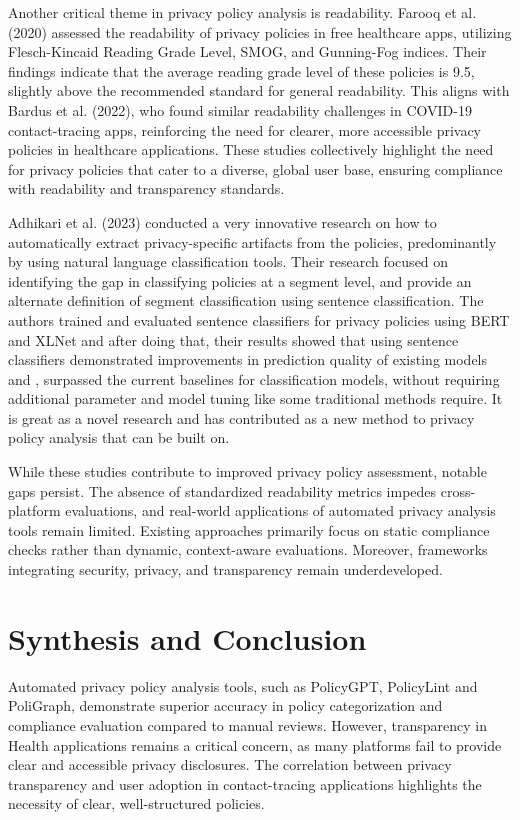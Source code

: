 \documentclass[conference]{IEEEtran}
\begin{document}
Another critical theme in privacy policy analysis is readability. Farooq et al. (2020)\cite{farooq_privacy_2020} assessed the readability of privacy policies in free healthcare apps, utilizing Flesch-Kincaid Reading Grade Level, SMOG, and Gunning-Fog indices. Their findings indicate that the average reading grade level of these policies is 9.5, slightly above the recommended standard for general readability. This aligns with Bardus et al. (2022)\cite{bardus_data_2022}, who found similar readability challenges in COVID-19 contact-tracing apps, reinforcing the need for clearer, more accessible privacy policies in healthcare applications. These studies collectively highlight the need for privacy policies that cater to a diverse, global user base, ensuring compliance with readability and transparency standards.

Adhikari et al. (2023)\cite{adhikari_privacy_2022} conducted a very innovative research on how to automatically extract privacy-specific artifacts from the policies, predominantly by using natural language classification tools. Their research focused on identifying the gap in classifying policies at a segment level, and provide an alternate definition of segment classification using sentence classification. The authors trained and evaluated sentence classifiers for privacy policies using BERT and XLNet and after doing that, their results showed that using sentence classifiers demonstrated improvements in prediction quality of existing models and , surpassed the current baselines for classification models, without requiring additional parameter and model tuning like some traditional methods require. It is great as a novel research and has contributed as a new method to privacy policy analysis that can be built on.

While these studies contribute to improved privacy policy assessment, notable gaps persist. The absence of standardized readability metrics impedes cross-platform evaluations, and real-world applications of automated privacy analysis tools remain limited. Existing approaches primarily focus on static compliance checks rather than dynamic, context-aware evaluations. Moreover, frameworks integrating security, privacy, and transparency remain underdeveloped.

\section{Synthesis and Conclusion}
Automated privacy policy analysis tools, such as PolicyGPT, PolicyLint and PoliGraph, demonstrate superior accuracy in policy categorization and compliance evaluation compared to manual reviews. However, transparency in Health applications remains a critical concern, as many platforms fail to provide clear and accessible privacy disclosures. The correlation between privacy transparency and user adoption in contact-tracing applications highlights the necessity of clear, well-structured policies.
\end{document}
